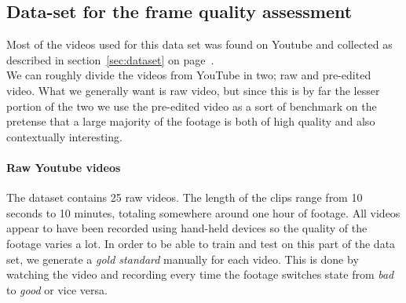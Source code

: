 \subsection{Data-set for the frame quality assessment} \label{sec:framequalityassessmentdataset}
%
Most of the videos used for this data set was found on Youtube and collected as described in section~\ref{sec:dataset} on page~\pageref{sec:dataset}.\\
We can roughly divide the videos from YouTube in two; raw and pre-edited video. What we generally want is raw video, but since this is by far the lesser portion of the two we use the pre-edited video as a sort of benchmark on the pretense that a large majority of the footage is both of high quality and also contextually interesting.\\
%
\paragraph{Raw Youtube videos}
The dataset contains 25 raw videos. The length of the clips range from 10 seconds to 10 minutes, totaling somewhere around one hour of footage.
All videos appear to have been recorded using hand-held devices so the quality of the footage varies a lot. In order to be able to train and test on this part of the data set, we generate a \textit{gold standard} manually for each video. This is done by watching the video and recording every time the footage switches state from \textit{bad} to \textit{good} or vice versa.
%
